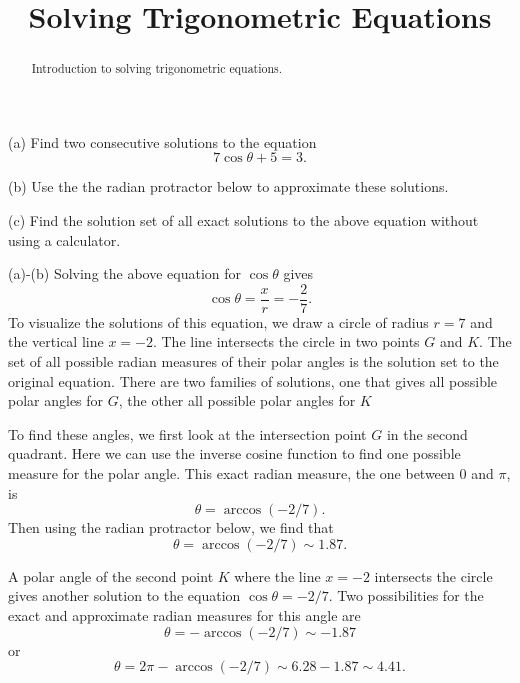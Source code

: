 \documentclass{ximera}
\title{Solving Trigonometric Equations}
\begin{document}
\begin{abstract}
Introduction to solving trigonometric equations.
\end{abstract}
\maketitle



\begin{example}  \label{Ex:43733g3e}
(a) Find two consecutive solutions to the equation
\[
    7 \cos\theta +5 =  3 .  
\]

(b) Use the the radian protractor below to approximate these solutions.

(c) Find the solution set of all exact solutions to the above equation without using a calculator.

\begin{explanation}
(a)-(b) Solving the above equation for $\cos\theta$ gives 
\[
   \cos \theta = \frac{x}{r} = -\frac{2}{7}.
\]
To visualize the solutions of this equation, we draw a circle of radius $r=7$ and the vertical line $x=-2$. The line intersects the circle in two points $G$ and $K$. The set of all possible radian measures of their polar angles is the solution set to the original equation. There are two families of solutions, one that gives all possible polar angles for $G$, the other all possible polar angles for $K$
 
 
\begin{onlineOnly}
    \begin{center}
\end{center}
\end{onlineOnly}


To find these angles, we first look at the intersection point $G$ in the second quadrant. Here we can use the inverse cosine function to find one possible measure for the polar angle. This exact radian measure, the one between $0$ and $\pi$, is 
\[
  \theta = \arccos(-2/7).
\]
Then using the radian protractor below, we find that
\[
   \theta  = \arccos(-2/7) \sim 1.87 .
\]



A polar angle of the second point $K$ where the line $x=-2$ intersects the circle gives another solution to the equation $\cos\theta = -2/7$. Two possibilities for the exact and approximate radian measures for this angle are
\[
   \theta = -\arccos(-2/7) \sim -1.87 
\]
or 
\[
       \theta = 2\pi - \arccos(-2/7) \sim 6.28 - 1.87 \sim 4.41 .
\]



\end{explanation}
\end{example}
\end{document}
